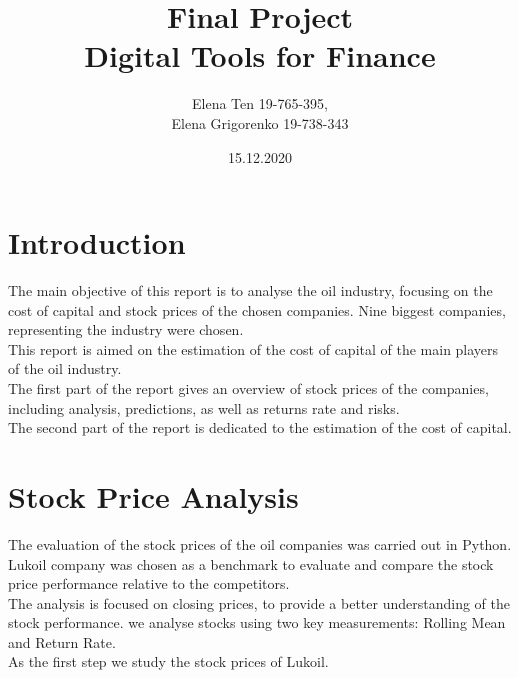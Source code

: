 \documentclass [a4paper, 11pt] {article}
\begin{document}
\title {\Huge Final Project \\
 \Huge Digital Tools for Finance }
\author {\huge Elena Ten 19-765-395, \\
	 	 \huge Elena Grigorenko 19-738-343}

\date {\huge 15.12.2020}



\maketitle
\thispagestyle{empty}

\newpage

\tableofcontents

\newpage

\section {Introduction}
The main objective of this report is to analyse the oil industry, focusing on the cost of capital and stock prices of the chosen companies. Nine biggest companies, representing the industry were chosen. \\
This report is aimed on the estimation of the cost of capital of the main players of the oil industry.\\
The first part of the report gives an overview of stock prices of the companies, including analysis, predictions, as well as returns rate and risks.\\
The second part of the report is dedicated to the estimation of the cost of capital.

\section {Stock Price Analysis}
The evaluation of the stock prices of the oil companies was carried out in Python.\\
Lukoil company was chosen as a benchmark to evaluate and compare the stock price performance relative to the competitors.\\
The analysis is focused on closing prices, to provide a better understanding of the stock performance. we analyse stocks using two key measurements: Rolling Mean and Return Rate.\\
As the first step we study the stock prices of Lukoil.
\end{document}
